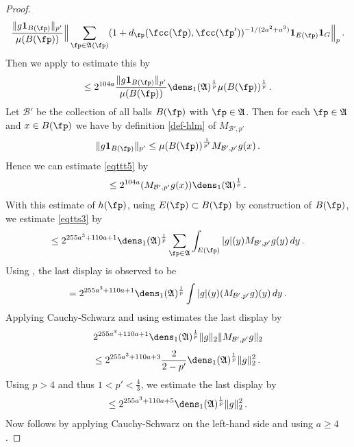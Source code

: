 \begin{proof}
\begin{equation}
    \frac{\|g\mathbf{1}_{B(\fp)}\|_{p'}}{\mu(B(\fp))}
    \Big\|\sum_{\fp\in\mathfrak{A}(\fp)}(1+d_{\fp}(\fcc(\fp), \fcc(\fp'))^{-1/(2a^2+a^3)}\mathbf{1}_{E(\fp)}\mathbf{1}_G\Big\|_{p}\, .
\end{equation}
Then we apply  to estimate this by
\begin{equation}\label{eqttt5}
    \le 2^{104a}
    \frac{\|g\mathbf{1}_{B(\fp)}\|_{p'}}{\mu(B(\fp))}
    \dens_1(\mathfrak{A})^{\frac 1p}\mu(B(\fp))^{\frac 1p}\,.
\end{equation}
Let $\mathcal{B}'$ be the collection of all balls
$B(\fp)$ with $\fp\in \mathfrak{A}$. Then
for each $\fp\in \mathfrak{A}$ and $x\in B(\fp)$ we have by
definition \eqref{def-hlm} of $M_{\mathcal{B}',p'}$
\begin{equation}
    \|g\mathbf{1}_{B(\fp)}\|_{p'}\le
    \mu(B(\fp))^{\frac 1{p'}} M_{\mathcal{B}',p'}g(x) \, .
\end{equation}
Hence we can estimate \eqref{eqttt5} by
\begin{equation}
\label{eqttt5b}
    \le
    2^{104a}
    (M_{\mathcal{B}', p'}g(x))
   \dens_1(\mathfrak{A})^{\frac 1p}\, .
\end{equation}
With this estimate of $h(\fp)$,
using $E(\fp)\subset B(\fp)$ by construction of $B(\fp)$, we estimate
\eqref{eqtts3} by
 \begin{equation}\label{eqtts4}
 \le 2^{255a^3+110a + 1} { \dens_1(\mathfrak{A})^{\frac 1p}}\sum_{\fp\in \mathfrak{A}}
 \int_{E(\fp)}|g|(y)M_{\mathcal{B}', p'}g(y) \, dy\,.
         \end{equation}
Using ,
the last display is observed to be
\begin{equation}\label{eqtts4a}
= 2^{255a^3+110a + 1}
 {\dens_1(\mathfrak{A})^{\frac 1p}} \int |g|(y)(M_{\mathcal{B}', p'}g)(y) \, dy\,.
         \end{equation}
Applying Cauchy-Schwarz and using  estimates the last display by
\begin{equation}
    2^{255a^3+110a + 1} \dens_1(\mathfrak{A})^{\frac 1p}
    \|g\|_2 \|M_{\mathcal{B}', p'} g\|_2
\end{equation}
\begin{equation}
    \le 2^{255a^3+110a + 3}\frac{2}{2-p'}
    \dens_1(\mathfrak{A})^{\frac 1p}\|g\|_2 ^2\,.
\end{equation}
Using $p>4$ and thus $1<p'<\frac 43$, we estimate the last display by
\begin{equation}
    \le 2^{255a^3+110a + 5} \dens_1(\mathfrak{A})^{\frac 1p}
    \|g\|_2^2\,.
\end{equation}
Now  follows by applying Cauchy-Schwarz on the left-hand side and using
$a\ge 4$.
\end{proof}
